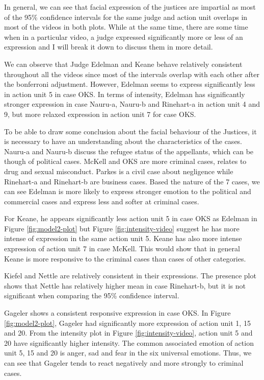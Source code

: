 \documentclass{monashthesis}
\begin{document}
In general, we can see that facial expression of the justices are impartial as most of the 95\% confidence intervals for the same judge and action unit overlaps in most of the videos in both plots. While at the same time, there are some time when in a particular video, a judge expressed significantly more or less of an expression and I will break it down to discuss them in more detail.

We can observe that Judge Edelman and Keane behave relatively consistent throughout all the videos since most of the intervals overlap with each other after the bonferroni adjustment. However, Edelman seems to express significantly less in action unit 5 in case OKS. In terms of intensity, Edelman has significantly stronger expression in case Nauru-a, Nauru-b and Rinehart-a in action unit 4 and 9, but more relaxed expression in action unit 7 for case OKS.

To be able to draw some conclusion about the facial behaviour of the Justices, it is necessary to have an understanding about the characteristics of the cases. Nauru-a and Nauru-b discuss the refugee status of the appellants, which can be though of political cases. McKell and OKS are more criminal cases, relates to drug and sexual misconduct. Parkes is a civil case about negligence while Rinehart-a and Rinehart-b are business cases. Based the nature of the 7 cases, we can see Edelman is more likely to express stronger emotion to the political and commercial cases and express less and softer at criminal cases.

For Keane, he appears significantly less action unit 5 in case OKS as Edelman in Figure \ref{fig:model2-plot} but Figure \ref{fig:intensity-video} suggest he has more intense of expression in the same action unit 5. Keane has also more intense expression of action unit 7 in case McKell. This would show that in general Keane is more responsive to the criminal cases than cases of other categories.

Kiefel and Nettle are relatively consistent in their expressions. The presence plot shows that Nettle has relatively higher mean in case Rinehart-b, but it is not significant when comparing the 95\% confidence interval.

Gageler shows a consistent responsive expression in case OKS. In Figure \ref{fig:model2-plot}, Gageler had significantly more expression of action unit 1, 15 and 20. From the intensity plot in Figure \ref{fig:intensity-video}, action unit 5 and 20 have significantly higher intensity. The common associated emotion of action unit 5, 15 and 20 is anger, sad and fear in the six universal emotions. Thus, we can see that Gageler tends to react negatively and more strongly to criminal cases.
\end{document}
